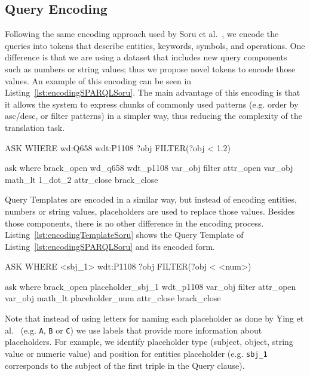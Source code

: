 \subsection{Query Encoding}
\label{cap3:system/queryGenModule/encoding}
Following the same encoding approach used by Soru et al.~\cite{nmt:nspm-SoruMMPVEN17}, we 
encode the \SPARQL{} queries into tokens that describe entities, keywords, symbols, and 
operations. One difference is that we are using a dataset that includes new query components 
such as numbers or string values; thus we propose novel tokens to encode those values. An 
example of this encoding can be seen in Listing~\ref{lst:encodingSPARQLSoru}. The main advantage of 
this encoding is that it allows the system to express chunks of commonly used patterns (e.g. 
order by asc/desc, or filter patterns) in a simpler way, thus reducing the complexity of the 
translation task.

\begin{sparqlcode}[%
    caption={\SPARQL{} query example with its encoded form.}, 
    label={lst:encodingSPARQLSoru}]
ASK WHERE { wd:Q658 wdt:P1108 ?obj FILTER(?obj < 1.2) }

ask where brack_open wd_q658 wdt_p1108 var_obj filter attr_open var_obj math_lt 1_dot_2 attr_close brack_close
\end{sparqlcode}

Query Templates are encoded in a similar way, but instead of encoding entities, numbers or 
string values, placeholders are used to replace those values. Besides those components, there 
is no other difference in the encoding process. Listing~\ref{lst:encodingTemplateSoru} shows 
the Query Template of Listing~\ref{lst:encodingSPARQLSoru} and its encoded form.

\begin{sparqlcode}[%
    caption={\SPARQL{} query example with its encoded form.}, 
    label={lst:encodingTemplateSoru}]
ASK WHERE { <sbj_1> wdt:P1108 ?obj FILTER(?obj < <num>) }

ask where brack_open placeholder_sbj_1 wdt_p1108 var_obj filter attr_open var_obj math_lt placeholder_num attr_close brack_close
\end{sparqlcode}

Note that instead of using letters for naming each placeholder as done by Ying et al.~\cite{nmt:nl-to-sparql-Yin19} 
(e.g. \texttt{A}, \texttt{B} or \texttt{C}) we use labels that provide more information about 
placeholders. For example, we identify placeholder type (subject, object, string value or 
numeric value) and position for entities placeholder (e.g. \texttt{sbj\_1} corresponds to the 
subject of the first triple in the Query clause).

